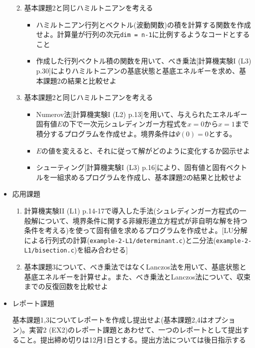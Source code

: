 \documentclass[11pt]{jarticle}
\begin{document}
\begin{itemize}
\begin{enumerate}
\begin{itemize}
    \end{itemize}
  \item 基本課題2と同じハミルトニアンを考える
    \begin{itemize}
      \item ハミルトニアン行列とベクトル(波動関数)の積を計算する関数を作成せよ。計算量が行列の次元{\tt dim = n-1}に比例するようなコードとすること
      \item 作成した行列ベクトル積の関数を用いて、べき乗法[計算機実験I (L3) p.30]によりハミルトニアンの基底状態と基底エネルギーを求め、基本課題2の結果と比較せよ
    \end{itemize}
  \item 基本課題2と同じハミルトニアンを考える
     \begin{itemize}
     \item Numerov法[計算機実験I (L2) p.13]を用いて、与えられたエネルギー固有値$E$の下で一次元シュレディンガー方程式を$x=0$から$x=1$まで積分するプログラムを作成せよ。境界条件は$\Psi(0)=0$とする。%
     \item $E$の値を変えると、それに従って解がどのように変化するか図示せよ
     \item シューティング[計算機実験I (L3) p.16]により、固有値と固有ベクトルを一組求めるプログラムを作成し、基本課題2の結果と比較せよ
    \end{itemize}
  \end{enumerate}  
\item 応用課題
  \begin{enumerate}
  \item 計算機実験II (L1) p.14-17で導入した手法(シュレディンガー方程式の一般解について、境界条件に関する非線形連立方程式が非自明な解を持つ条件を考える)を使って固有値を求めるプログラムを作成せよ。[LU分解による行列式の計算({\tt example-2-L1/determinant.c})と二分法({\tt example-2-L1/bisection.c})を組み合わせる]
  \item 基本課題3について、べき乗法ではなくLanczos法を用いて、基底状態と基底エネルギーを計算せよ。また、べき乗法とLanczos法について、収束までの反復回数を比較せよ
  \end{enumerate}

\item レポート課題

  基本課題1,3についてレポートを作成し提出せよ(基本課題2,4はオプション)。実習2 (EX2)のレポート課題とあわせて、一つのレポートとして提出すること。提出締め切りは12月1日とする。提出方法については後日指示する
  
\end{itemize}
\end{document}
